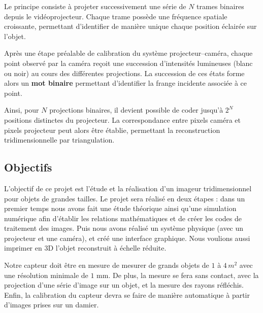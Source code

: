 \documentclass[10pt]{article} %
\begin{document}
Le principe consiste à projeter successivement une série de $N$ trames binaires
depuis le vidéoprojecteur. Chaque trame possède une fréquence spatiale croissante,
permettant d’identifier de manière unique chaque position éclairée sur l’objet.

Après une étape préalable de calibration du système projecteur--caméra,
chaque point observé par la caméra reçoit une succession d’intensités lumineuses
(blanc ou noir) au cours des différentes projections.
La succession de ces états forme alors un \textbf{mot binaire}
permettant d’identifier la frange incidente associée à ce point.

Ainsi, pour $N$ projections binaires, il devient possible de coder jusqu’à
$2^{N}$ positions distinctes du projecteur.
La correspondance entre pixels caméra et pixels projecteur peut alors être établie,
permettant la reconstruction tridimensionnelle par triangulation.

\subsection{Objectifs}

L'objectif de ce projet est l’étude et la réalisation d’un imageur tridimensionnel pour objets de grandes tailles.
Le projet sera réalisé en deux étapes : dans un premier temps nous avons fait une étude théorique ainsi qu'une simulation numérique afin d'établir les relations mathématiques et de créer les codes de traitement des images. Puis nous avons réalisé un système physique (avec un projecteur et une caméra), et créé une interface graphique. Nous voulions aussi imprimer en 3D l'objet reconstruit à échelle réduite.

Notre capteur doit être en mesure de mesurer de grands objets de $1$ à $4\,m^2$ avec une résolution minimale de $ 1$ mm.
De plus, la mesure se fera sans contact, avec la projection d'une série d'image sur un objet, et la mesure des rayons réfléchis.
Enfin, la calibration du capteur devra se faire de manière automatique à partir d'images prises sur un damier. 
\end{document}
